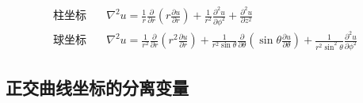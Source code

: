$$\begin{aligned}
\text{柱坐标}\quad&\nabla^2u=\frac{1}{r}\frac{\partial}{\partial r}\left(r\frac{\partial u}{\partial r}\right)+\frac{1}{r^2}\frac{\partial^2u}{\partial \phi^2}+\frac{\partial^2 u}{\partial z^2}\\
\text{球坐标}\quad&\nabla^2u=\frac{1}{r^2}\frac{\partial}{\partial r}
\left(r^2\frac{\partial u}{\partial r}\right)+\frac{1}{r^2\sin\theta}\frac{\partial}{\partial\theta}
\left(\sin\theta\frac{\partial u}{\partial \theta}\right)+\frac{1}{r^2\sin^2\theta}\frac{\partial^2 u}{\partial \phi^2}
\end{aligned}$$



\subsection{正交曲线坐标的分离变量}
